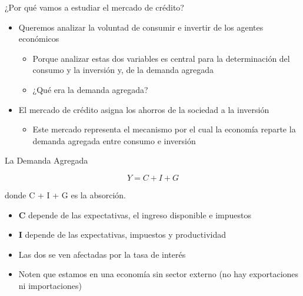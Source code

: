 \documentclass{beamer}
\begin{document}
\begin{frame}{¿Por qué vamos a estudiar el mercado de crédito?}
    \begin{itemize}
        \item Queremos analizar la voluntad de consumir e invertir de los agentes económicos \vspace{1mm}
        \begin{itemize}
            \item Porque analizar estas dos variables es central para la determinación del consumo y la inversión y, de la demanda agregada
            \item ¿Qué era la demanda agregada? 
        \end{itemize}
        \vspace{3mm}
        \item El mercado de crédito asigna los ahorros de la sociedad a la inversión \vspace{1mm}
        \begin{itemize}
            \item Este mercado representa el mecanismo por el cual la economía reparte la demanda agregada entre consumo e inversión
        \end{itemize}
    \end{itemize}
\end{frame}

\begin{frame}{La Demanda Agregada}
\begin{itemize}
\begin{tcolorbox}[width=4in,
                  interior hidden,
                  boxsep=0pt,
                  left=0pt,
                  right=0pt,
                  top=2pt,
                  ]%
$$ Y = C + I + G $$
\end{tcolorbox}
    \end{itemize}
\centering donde C + I + G es la absorción.
\vspace{1cm}
\begin{itemize}
        \item \textbf{C} depende de las expectativas, el ingreso disponible e impuestos
        \item \textbf{I} depende de las expectativas, impuestos y productividad
        \item Las dos se ven afectadas por la tasa de interés
        \item Noten que estamos en una economía sin sector externo (no hay exportaciones ni importaciones)
\end{itemize}
\end{frame}
\end{document}
